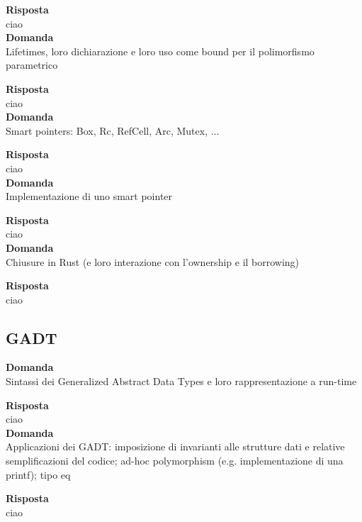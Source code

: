\documentclass{article}
\begin{document}
\textbf{Risposta}\\
ciao
\vspace{14pt}\\
\textbf{Domanda}\\
Lifetimes, loro dichiarazione e loro uso come bound per il polimorfismo parametrico

\textbf{Risposta}\\
ciao
\vspace{14pt}\\
\textbf{Domanda}\\
Smart pointers: Box, Rc, RefCell, Arc, Mutex, ...

\textbf{Risposta}\\
ciao
\vspace{14pt}\\
\textbf{Domanda}\\
Implementazione di uno smart pointer

\textbf{Risposta}\\
ciao
\vspace{14pt}\\
\textbf{Domanda}\\
Chiusure in Rust (e loro interazione con l'ownership e il borrowing)

\textbf{Risposta}\\
ciao
\vspace{14pt}\\

\subsection*{GADT}
\textbf{Domanda}\\
Sintassi dei Generalized Abstract Data Types e loro rappresentazione a run-time

\textbf{Risposta}\\
ciao
\vspace{14pt}\\
\textbf{Domanda}\\
Applicazioni dei GADT: imposizione di invarianti alle strutture dati e relative semplificazioni del codice; ad-hoc polymorphism (e.g. implementazione di una printf); tipo eq

\textbf{Risposta}\\
ciao
\vspace{14pt}\\
\end{document}
